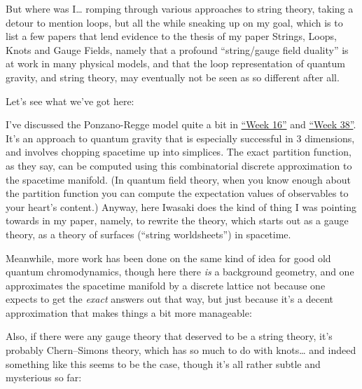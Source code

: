 \documentclass{article}
\def\tightlist{}
\renewcommand{\texttt}[1]{%
  \begingroup
  \ttfamily
  \begingroup\lccode`~=`/\lowercase{\endgroup\def~}{/\discretionary{}{}{}}%
  \begingroup\lccode`~=`[\lowercase{\endgroup\def~}{[\discretionary{}{}{}}%
  \begingroup\lccode`~=`.\lowercase{\endgroup\def~}{.\discretionary{}{}{}}%
  \catcode`/=\active\catcode`[=\active\catcode`.=\active
  \scantokens{#1\noexpand}%
  \endgroup
}
\begin{document}
But where was I\ldots{} romping through various approaches to string
theory, taking a detour to mention loops, but all the while sneaking up
on my goal, which is to list a few papers that lend evidence to the
thesis of my paper Strings, Loops, Knots and Gauge Fields, namely that a
profound ``string/gauge field duality'' is at work in many physical
models, and that the loop representation of quantum gravity, and string
theory, may eventually not be seen as so different after all.

Let's see what we've got here:


I've discussed the Ponzano-Regge model quite a bit in
\protect\hyperlink{week16}{``Week 16''} and
\protect\hyperlink{week38}{``Week 38''}. It's an approach to quantum
gravity that is especially successful in 3 dimensions, and involves
chopping spacetime up into simplices. The exact partition function, as
they say, can be computed using this combinatorial discrete
approximation to the spacetime manifold. (In quantum field theory, when
you know enough about the partition function you can compute the
expectation values of observables to your heart's content.) Anyway, here
Iwasaki does the kind of thing I was pointing towards in my paper,
namely, to rewrite the theory, which starts out as a gauge theory, as a
theory of surfaces (``string worldsheets'') in spacetime.

Meanwhile, more work has been done on the same kind of idea for good old
quantum chromodynamics, though here there \emph{is} a background
geometry, and one approximates the spacetime manifold by a discrete
lattice not because one expects to get the \emph{exact} answers out that
way, but just because it's a decent approximation that makes things a
bit more manageable:

\noindent
Also, if there were any gauge theory that deserved to be a string
theory, it's probably Chern--Simons theory, which has so much to do with
knots\ldots{} and indeed something like this seems to be the case,
though it's all rather subtle and mysterious so far:
\end{document}

